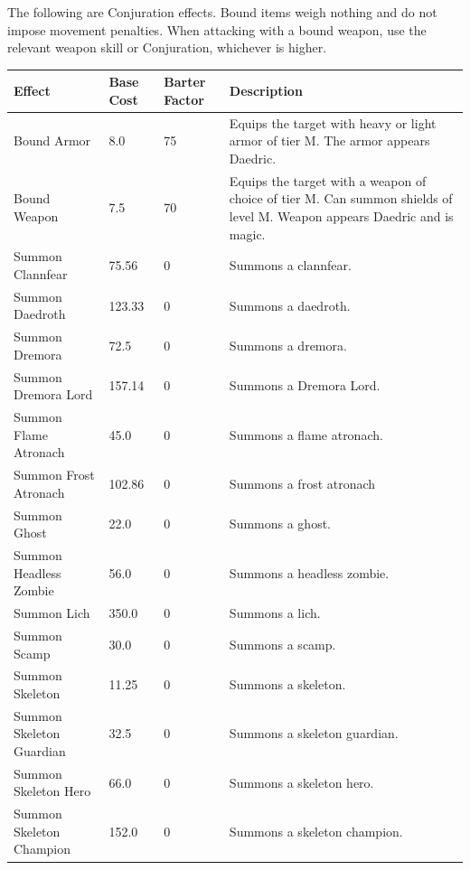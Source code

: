 \documentclass[12pt]{book}
\begin{document}
\newpage
The following are Conjuration effects. Bound items weigh nothing and do not impose movement penalties. When attacking with a bound weapon, use the relevant weapon skill or Conjuration, whichever is higher.

\begin{tabular}{p{}|p{}|p{}|p{}}
Effect & Base Cost & Barter Factor & Description\\ \hline
Bound Armor & 8.0 & 75 & Equips the target with heavy or light armor of tier M. The armor appears Daedric.\\ \hline
Bound Weapon & 7.5 & 70 & Equips the target with a weapon of choice of tier M. Can summon shields of level M. Weapon appears Daedric and is magic.\\ \hline
Summon Clannfear & 75.56 & 0 & Summons a clannfear.\\ \hline
Summon Daedroth & 123.33 & 0 & Summons a daedroth.\\ \hline
Summon Dremora & 72.5 & 0 & Summons a dremora.\\ \hline
Summon Dremora Lord & 157.14 & 0 & Summons a Dremora Lord.\\ \hline
Summon Flame Atronach & 45.0 & 0 & Summons a flame atronach.\\ \hline
Summon Frost Atronach & 102.86 & 0 & Summons a frost atronach\\ \hline
Summon Ghost & 22.0 & 0 & Summons a ghost.\\ \hline
Summon Headless Zombie & 56.0 & 0 & Summons a headless zombie.\\ \hline
Summon Lich & 350.0 & 0 & Summons a lich.\\ \hline
Summon Scamp & 30.0 & 0 & Summons a scamp.\\ \hline
Summon Skeleton & 11.25 & 0 & Summons a skeleton.\\ \hline
Summon Skeleton Guardian & 32.5 & 0 & Summons a skeleton guardian.\\ \hline
Summon Skeleton Hero & 66.0 & 0 & Summons a skeleton hero.\\ \hline
Summon Skeleton Champion & 152.0 & 0 & Summons a skeleton champion.\\
\end{tabular}
\end{document}

